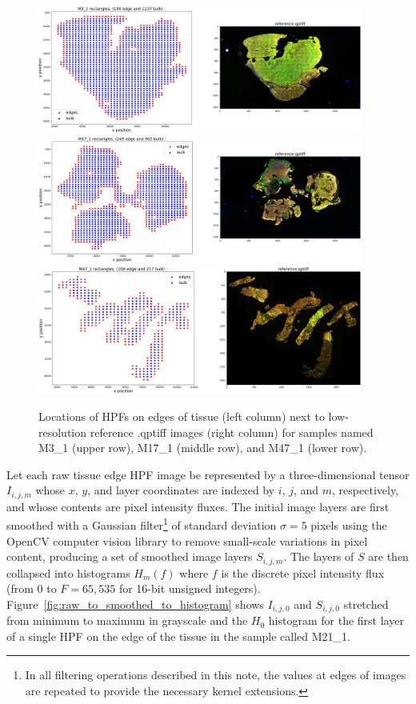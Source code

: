 \documentclass[letterpaper,11pt]{article}
\newcommand{\reffig}[1]{Figure~\ref{#1}}
\begin{document}
\begin{figure}[!ht]
\centering
\includegraphics[width=0.95\textwidth]{images/masking/rectangle_locations_M3_1}
\includegraphics[width=0.95\textwidth]{images/masking/rectangle_locations_M17_1}
\includegraphics[width=0.95\textwidth]{images/masking/rectangle_locations_M47_1}
\caption{\footnotesize Locations of HPFs on edges of tissue (left column) next to low-resolution reference .qptiff images (right column) for samples named M3\_1 (upper row), M17\_1 (middle row), and M47\_1 (lower row). }
\label{fig:edge_HPFs}
\end{figure}

Let each raw tissue edge HPF image be represented by a three-dimensional tensor $I_{i,j,m}$ whose $x$, $y$, and layer coordinates are indexed by $i$, $j$, and $m$, respectively, and whose contents are pixel intensity fluxes. The initial image layers are first smoothed with a Gaussian filter\footnote{In all filtering operations described in this note, the values at edges of images are repeated to provide the necessary kernel extensions.} of standard deviation $\sigma=5$ pixels using the OpenCV computer vision library \cite{opencv_library} to remove small-scale variations in pixel content, producing a set of smoothed image layers $S_{i,j,m}$. The layers of $S$ are then collapsed into histograms $H_{m}(f)$ where $f$ is the discrete pixel intensity flux (from 0 to $F=65,535$ for 16-bit unsigned integers). \reffig{fig:raw_to_smoothed_to_histogram} shows $I_{i,j,0}$ and $S_{i,j,0}$ stretched from minimum to maximum in grayscale and the $H_{0}$ histogram for the first layer of a single HPF on the edge of the tissue in the sample called M21\_1. 
\end{document}

